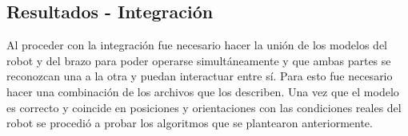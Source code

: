 \subsection{Resultados - Integración}
Al proceder con la integración fue necesario hacer la unión de los modelos del robot y del brazo para poder operarse simultáneamente y que ambas partes se reconozcan una a la otra y puedan interactuar entre sí. Para esto fue necesario hacer una combinación de los archivos que los describen. Una vez que el modelo es correcto y coincide en posiciones y orientaciones con las condiciones reales del robot se procedió a probar los algoritmos que se plantearon anteriormente. 





